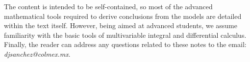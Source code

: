 \documentclass[12pt]{report}
\begin{document}
The content is intended to be self-contained, so most of the advanced mathematical tools required to derive conclusions from the models are detailed within the text itself. However, being aimed at advanced students, we assume familiarity with the basic tools of multivariable integral and differential calculus. Finally, the reader can address any questions related to these notes to the email: \textit{djsanchez@colmex.mx}.






\end{document}
